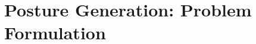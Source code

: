 

\chapter{Posture Generation: Problem Formulation}
\label{cha:posture_generation_problem_formulation}



\graphicspath{{Chapter2-PG/Figs/}}



